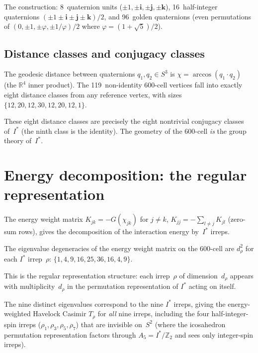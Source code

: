 The construction: 8~quaternion units ($\pm 1, \pm\mathbf{i},
\pm\mathbf{j}, \pm\mathbf{k}$), 16~half-integer quaternions
$(\pm 1 \pm \mathbf{i} \pm \mathbf{j} \pm \mathbf{k})/2$,
and 96~golden quaternions (even permutations of
$(0, \pm 1, \pm\varphi, \pm 1/\varphi)/2$ where
$\varphi = (1+\sqrt{5})/2$).

\subsection{Distance classes and conjugacy classes}

The geodesic distance between quaternions $q_1, q_2 \in S^3$ is
$\chi = \arccos(q_1 \cdot q_2)$ (the $\mathbb{R}^4$ inner product).
The 119~non-identity 600-cell vertices fall into exactly eight
distance classes from any reference vertex, with sizes
$\{12, 20, 12, 30, 12, 20, 12, 1\}$.

These eight distance classes are precisely the eight nontrivial
conjugacy classes of~$I^*$ (the ninth class is the identity).
The geometry of the 600-cell \emph{is} the group theory of~$I^*$.

\section{Energy decomposition: the regular representation}
\label{sec:energy-decomp}

The energy weight matrix $K_{jk} = -G(\chi_{jk})$ for $j \neq k$,
$K_{jj} = -\sum_{l \neq j} K_{jl}$ (zero-sum rows), gives the
decomposition of the interaction energy by~$I^*$ irreps.

\begin{theorem}\label{thm:regular-rep}
The eigenvalue degeneracies of the energy weight matrix on the
600-cell are $d_\rho^2$ for each $I^*$ irrep~$\rho$:
$\{1, 4, 9, 16, 25, 36, 16, 4, 9\}$.
\end{theorem}

\noindent
This is the regular representation structure: each irrep~$\rho$ of
dimension~$d_\rho$ appears with multiplicity~$d_\rho$ in the
permutation representation of $I^*$ acting on itself.

The nine distinct eigenvalues correspond to the nine $I^*$ irreps,
giving the energy-weighted Havelock Casimir $T_\rho$ for \emph{all}
nine irreps, including the four half-integer-spin irreps
($\rho_1, \rho_3, \rho_5, \rho_7$) that are invisible on~$S^2$
(where the icosahedron permutation representation factors through
$A_5 = I^*/\mathbb{Z}_2$ and sees only integer-spin irreps).

